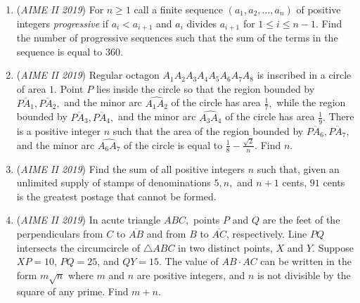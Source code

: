 \begin{enumerate}
	\item (\textit{AIME II 2019}) For $n\ge1$ call a finite sequence $(a_1,a_2,\ldots,a_n)$ of positive integers \textit{progressive} if $a_i<a_{i+1}$ and $a_i$ divides $a_{i+1}$ for $1\le i\le n-1$. Find the number of progressive sequences such that the sum of the terms in the sequence is equal to $360.$


	\item (\textit{AIME II 2019}) Regular octagon $A_1A_2A_3A_4A_5A_6A_7A_8$ is inscribed in a circle of area $1.$ Point $P$ lies inside the circle so that the region bounded by $\overline{PA_1},\overline{PA_2},$ and the minor arc $\widehat{A_1A_2}$ of the circle has area $\frac{1}{7},$ while the region bounded by $\overline{PA_3},\overline{PA_4},$ and the minor arc $\widehat{A_3A_4}$ of the circle has area $\frac{1}{9}.$ There is a positive integer $n$ such that the area of the region bounded by $\overline{PA_6},\overline{PA_7},$ and the minor arc $\widehat{A_6A_7}$ of the circle is equal to $\frac{1}{8}-\frac{\sqrt2}{n}.$ Find $n.$


	\item (\textit{AIME II 2019}) Find the sum of all positive integers $n$ such that, given an unlimited supply of stamps of denominations $5,n,$ and $n+1$ cents, $91$ cents is the greatest postage that cannot be formed.


 

	\item (\textit{AIME II 2019}) In acute triangle $ABC,$ points $P$ and $Q$ are the feet of the perpendiculars from $C$ to $\overline{AB}$ and from $B$ to $\overline{AC}$, respectively. Line $PQ$ intersects the circumcircle of $\triangle ABC$ in two distinct points, $X$ and $Y$. Suppose $XP=10$, $PQ=25$, and $QY=15$. The value of $AB\cdot AC$ can be written in the form $m\sqrt n$ where $m$ and $n$ are positive integers, and $n$ is not divisible by the square of any prime. Find $m+n$.


 

\end{enumerate}